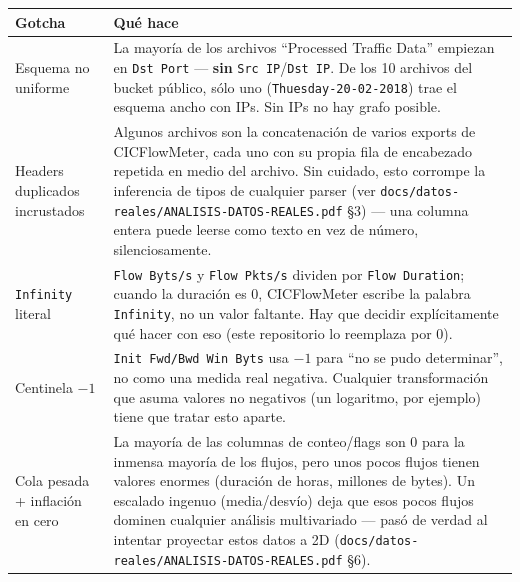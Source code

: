 \documentclass[11pt]{article}
\newcommand{\code}[1]{\texttt{\small #1}}
\begin{document}
\begin{center}
\begin{longtable}{@{}p{4.2cm}p{9.5cm}@{}}
\toprule
\textbf{Gotcha} & \textbf{Qué hace} \\
\midrule
\endhead
Esquema no uniforme & La mayoría de los archivos ``Processed Traffic Data'' empiezan en
  \code{Dst Port} --- \textbf{sin} \code{Src IP}/\code{Dst IP}. De los 10 archivos del
  bucket público, sólo uno (\code{Thuesday-20-02-2018}) trae el esquema ancho con IPs. Sin
  IPs no hay grafo posible. \\
Headers duplicados incrustados & Algunos archivos son la concatenación de varios exports
  de CICFlowMeter, cada uno con su propia fila de encabezado repetida en medio del
  archivo. Sin cuidado, esto corrompe la inferencia de tipos de cualquier parser (ver
  \code{docs/datos-reales/ANALISIS-DATOS-REALES.pdf} \S3) --- una columna entera puede
  leerse como texto en vez de número, silenciosamente. \\
\code{Infinity} literal & \code{Flow Byts/s} y \code{Flow Pkts/s} dividen por
  \code{Flow Duration}; cuando la duración es 0, CICFlowMeter escribe la palabra
  \code{Infinity}, no un valor faltante. Hay que decidir explícitamente qué hacer con
  eso (este repositorio lo reemplaza por 0). \\
Centinela $-1$ & \code{Init Fwd/Bwd Win Byts} usa $-1$ para ``no se pudo determinar'',
  no como una medida real negativa. Cualquier transformación que asuma valores no
  negativos (un logaritmo, por ejemplo) tiene que tratar esto aparte. \\
Cola pesada + inflación en cero & La mayoría de las columnas de conteo/flags son 0 para
  la inmensa mayoría de los flujos, pero unos pocos flujos tienen valores enormes
  (duración de horas, millones de bytes). Un escalado ingenuo (media/desvío) deja que
  esos pocos flujos dominen cualquier análisis multivariado --- pasó de verdad al
  intentar proyectar estos datos a 2D (\code{docs/datos-reales/ANALISIS-DATOS-REALES.pdf}
  \S6). \\
\bottomrule
\end{longtable}
\end{center}
\end{document}
